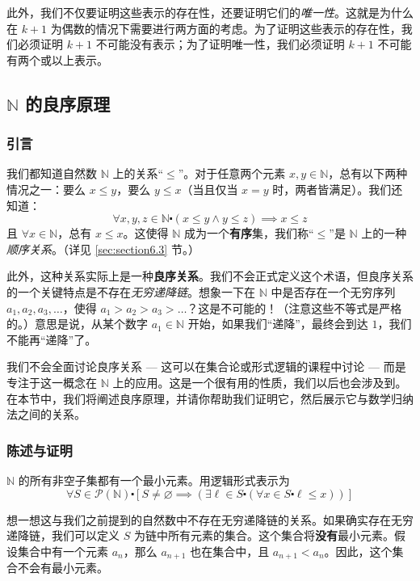 此外，我们不仅要证明这些表示的存在性，还要证明它们的\emph{唯一性}。这就是为什么在 $k+1$ 为偶数的情况下需要进行两方面的考虑。为了证明这些表示的存在性，我们必须证明 $k+1$ 不可能没有表示；为了证明唯一性，我们必须证明 $k+1$ 不可能有两个或以上表示。

\subsection{$\mathbb{N}$ 的良序原理} \label{sec:section5.5.2}

\subsubsection*{引言}

我们都知道自然数 $\mathbb{N}$ 上的关系``$\le$''。对于任意两个元素 $x, y \in \mathbb{N}$，总有以下两种情况之一：要么 $x \le y$，要么 $y \le x$（当且仅当 $x = y$ 时，两者皆满足）。我们还知道：
\[\forall x, y, z \in \mathbb{N} \centerdot (x \le y \land y \le z) \implies x \le z\]
且 $\forall x \in \mathbb{N}$，总有 $x \le x$。这使得 $\mathbb{N}$ 成为一个\textbf{有序}集，我们称``$\le$''是 $\mathbb{N}$ 上的一种\emph{顺序关系}。（详见 \ref{sec:section6.3} 节。）

此外，这种关系实际上是一种\textbf{良序关系}。我们不会正式定义这个术语，但良序关系的一个关键特点是不存在\emph{无穷递降链}。想象一下在 $\mathbb{N}$ 中是否存在一个无穷序列 $a_1, a_2, a_3, \dots$，使得 $a_1 > a_2 > a_3 > \dots$？这是不可能的！（注意这些不等式是严格的。）意思是说，从某个数字 $a_1 \in \mathbb{N}$ 开始，如果我们``递降''，最终会到达 $1$，我们不能再``递降''了。

我们不会全面讨论良序关系 --- 这可以在集合论或形式逻辑的课程中讨论 --- 而是专注于这一概念在 $\mathbb{N}$ 上的应用。这是一个很有用的性质，我们以后也会涉及到。在本节中，我们将阐述良序原理，并请你帮助我们证明它，然后展示它与数学归纳法之间的关系。

\subsubsection*{陈述与证明}

\begin{theorem}\label{theorem5.5.2}
    $\mathbb{N}$ 的所有非空子集都有一个最小元素。用逻辑形式表示为
    \[\forall S \in \mathcal{P}(\mathbb{N}) \centerdot [S \ne \varnothing \implies (\exists \ell \in S \centerdot (\forall x \in S \centerdot \ell \le x))]\]
\end{theorem}

想一想这与我们之前提到的自然数中不存在无穷递降链的关系。如果确实存在无穷递降链，我们可以定义 $S$ 为链中所有元素的集合。这个集合将\textbf{没有}最小元素。假设集合中有一个元素 $a_n$，那么 $a_{n+1}$ 也在集合中，且 $a_{n+1} < a_n$。因此，这个集合不会有最小元素。

